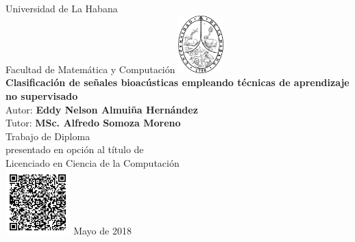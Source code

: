 \documentclass[12pt]{report}
\begin{document}
    \begin{titlepage}
        \begin{center}
        {\large Universidad de La Habana}
            \\ Facultad de Matemática y Computación
            \vskip 0.25cm
            \includegraphics[width=1.75cm]{images/uh} \\
            \vfill
            {\LARGE \textbf{Clasificación de señales bioacústicas empleando técnicas de aprendizaje no supervisado}} \\
            \vskip 2cm
            {\Large Autor: \textbf{Eddy Nelson Almuiña Hernández}} \\
            \vskip 0.5cm
            {\Large Tutor: \textbf{MSc. Alfredo Somoza Moreno}} \\
            \vfill
            {\large Trabajo de Diploma \\presentado en opción al título de \\Licenciado en Ciencia de la Computación} \\
            \vskip 0.5cm
            \includegraphics[width=2.5cm]{images/qrcode}
            \vskip 0.5cm
            Mayo de 2018
        \end{center}
    \end{titlepage}
\end{document}
